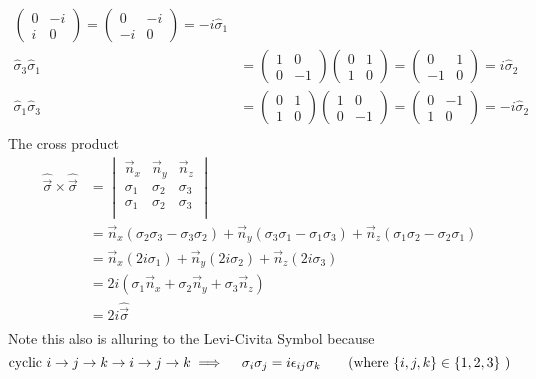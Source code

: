 \documentclass[letter]{article}
\begin{document}
\begin{align*}
	\begin{pmatrix} 0&-i\\i&0 \end{pmatrix} = 
\begin{pmatrix} 0&-i\\-i&0 \end{pmatrix} = -i \hat{\sigma}_1 \\ 
\hat{\sigma}_3 \hat{\sigma}_1  &= 
\begin{pmatrix} 1&0\\0&-1  \end{pmatrix} 
\begin{pmatrix} 0&1\\1&0 \end{pmatrix} 
= \begin{pmatrix} 0&1\\-1&0 \end{pmatrix}  = i \hat{\sigma}_2 \\ 
\hat{\sigma}_1 \hat{\sigma}_3  &= 
\begin{pmatrix} 0&1\\1&0 \end{pmatrix} 
\begin{pmatrix} 1&0\\0&-1  \end{pmatrix} 
= \begin{pmatrix} 0&-1\\1&0 \end{pmatrix}  = -i \hat{\sigma}_2 \\ 
\end{align*}
The cross product 
\begin{align*}
	\hat{\vec{\sigma}} \times \hat{\vec{\sigma}} 
&= \begin{vmatrix} \vec{n}_x & \vec{n}_y & \vec{n}_z \\
\sigma_1 & \sigma_2 & \sigma_3 \\ 
\sigma_1 & \sigma_2 & \sigma_3 \\ 
\end{vmatrix}  \\
	&= \vec{n}_x \left(\sigma_2 \sigma_3 - \sigma_3 \sigma_2\right) + \vec{n}_y \left(\sigma_3 \sigma_1 - \sigma_1 \sigma_3 \right) + \vec{n}_z \left(\sigma_1 \sigma_2 - \sigma_2 \sigma_1\right)  \\ 
	&= \vec{n}_x (2 i \sigma_1) + \vec{n}_y \left( 2 i \sigma_2\right) + \vec{n}_z \left(2 i \sigma_3\right) \\
	&= 2 i \left(\sigma_1 \vec{n}_x + \sigma_2 \vec{n}_y + \sigma_3 \vec{n}_z\right) \\
	&= 2 i \hat{\vec{\sigma}} \\
\end{align*}
Note this also is alluring to the Levi-Civita Symbol because 
\[ \text{cyclic }
i \to j \to k \to i \to j \to  k \implies
	\quad \sigma_i \sigma_j = i\epsilon_{ij} \sigma_k \tag{where $\{i,j,k\} \in \{1,2,3\} $ }
\]
\end{document}
